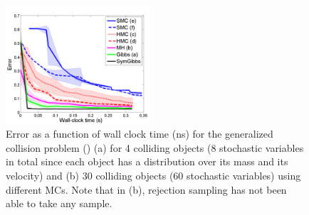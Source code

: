 \documentclass{article}
\begin{document}
{%
\begin{figure}
\centering
     \includegraphics[width=0.8\linewidth, height=125pt]
{plotsx/vis-col/err-vs-time__param2-shaded.pdf}
      \caption{Error
as a function of wall clock time (ns) for the generalized collision problem () 
(a) for 4 colliding objects (8 stochastic variables in total since each object has a distribution over its mass and its velocity) and (b) 30 colliding objects (60 stochastic variables)
using different MCs. Note that in (b), rejection sampling has not been able to take any sample.}
\end{figure}





}
\end{document}
